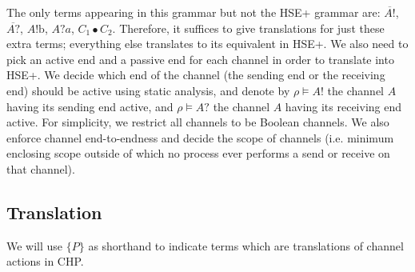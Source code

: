 \documentclass[times, 10pt]{article}
\begin{document}
The only terms appearing in this grammar but not the HSE+ grammar are:
$\overline{A!}$, $\overline{A?}$, $A!\mathrm{b}$, $A?a$, $C_1 \bullet C_2$.
Therefore, it suffices to give translations for just these extra terms;
everything else translates to its equivalent in HSE+. We also need to pick an
active end and a passive end for each channel in order to translate into HSE+.
We decide which end of the channel (the sending end or the receiving end) should
be active using static analysis, and denote by $\rho \vDash A!$ the channel $A$
having its sending end active, and $\rho \vDash A?$ the channel $A$ having its
receiving end active.  For simplicity, we restrict all channels to be Boolean
channels. We also enforce channel end-to-endness and decide the scope of
channels (i.e. minimum enclosing scope outside of which no process ever performs
a send or receive on that channel).

\subsection{Translation}


We will use $\{P\}$ as shorthand to indicate terms which are translations of
channel actions in CHP.
\end{document}
